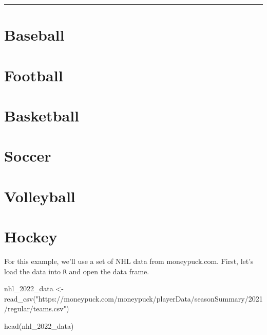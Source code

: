 \documentclass[
]{book}
\newenvironment{Shaded}{\begin{snugshade}}{\end{snugshade}}
\newcommand{\FunctionTok}[1]{\textcolor[rgb]{0.00,0.00,0.00}{#1}}
\newcommand{\NormalTok}[1]{#1}
\newcommand{\OtherTok}[1]{\textcolor[rgb]{0.56,0.35,0.01}{#1}}
\newcommand{\StringTok}[1]{\textcolor[rgb]{0.31,0.60,0.02}{#1}}
\theoremstyle{definition}
\theoremstyle{definition}
\theoremstyle{definition}
\theoremstyle{definition}
\theoremstyle{remark}
\begin{document}
\begin{center}\rule{0.5\linewidth}{0.5pt}\end{center}

\hypertarget{baseball}{%
\section{Baseball}\label{baseball}}

\hypertarget{football}{%
\section{Football}\label{football}}

\hypertarget{basketball}{%
\section{Basketball}\label{basketball}}

\hypertarget{soccer}{%
\section{Soccer}\label{soccer}}

\hypertarget{volleyball}{%
\section{Volleyball}\label{volleyball}}

\hypertarget{hockey}{%
\section{Hockey}\label{hockey}}

For this example, we'll use a set of NHL data from moneypuck.com. First, let's load the data into \texttt{R} and open the data frame.

\begin{Shaded}
\begin{Highlighting}[]
\NormalTok{nhl\_2022\_data }\OtherTok{\textless{}{-}} \FunctionTok{read\_csv}\NormalTok{(}\StringTok{"https://moneypuck.com/moneypuck/playerData/seasonSummary/2021/regular/teams.csv"}\NormalTok{)}

\FunctionTok{head}\NormalTok{(nhl\_2022\_data)}
\end{Highlighting}
\end{Shaded}
\end{document}
